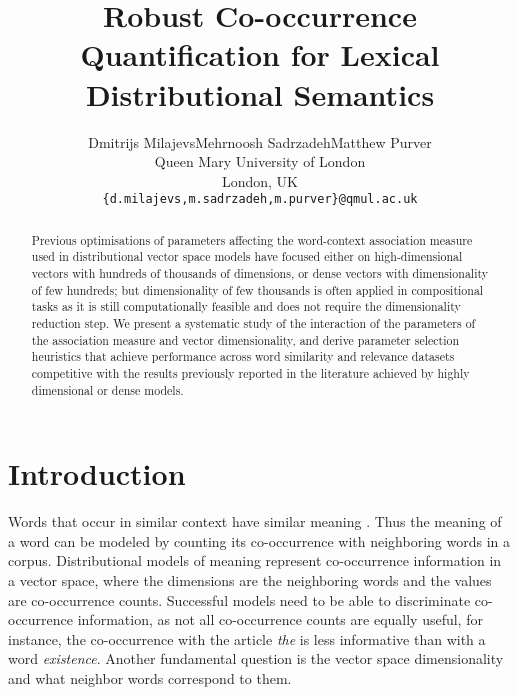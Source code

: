 \documentclass[11pt]{article}
\title{Robust Co-occurrence Quantification for Lexical Distributional Semantics}
\author{Dmitrijs Milajevs\qquad{}Mehrnoosh Sadrzadeh\qquad{}Matthew Purver\\
  Queen Mary University of London\\
  London, UK\\
  {\tt \{d.milajevs,m.sadrzadeh,m.purver\}@qmul.ac.uk}
}
\date{}
\begin{document}
\def\PMI/{$\operatorname{1PMI}$}
\def\SPMI/{$\operatorname{1SPMI}$}
\def\CPMI/{$\operatorname{1CPMI}$}
\def\SCPMI/{$\operatorname{1SCPMI}$}

\def\NPMI/{$\operatorname{nPMI}$}
\def\NSPMI/{$\operatorname{nSPMI}$}
\def\NCPMI/{$\operatorname{nCPMI}$}
\def\NSCPMI/{$\operatorname{nSCPMI}$}

\def\logNPMI/{$\operatorname{lognPMI}$}
\def\logNSPMI/{$\operatorname{lognSPMI}$}
\def\logNCPMI/{$\operatorname{lognCPMI}$}
\def\logNSCPMI/{$\operatorname{lognSCPMI}$}

\maketitle
\begin{abstract}
Previous optimisations of parameters affecting the word-context association measure used in distributional vector space models have focused either on high-dimensional vectors with hundreds of thousands of dimensions, or dense vectors with dimensionality of few hundreds; but dimensionality of few thousands is often applied in compositional tasks as it is still computationally feasible and does not require the dimensionality reduction step. We present a systematic study of the interaction of the parameters of the association measure and vector dimensionality, and derive parameter selection heuristics that achieve performance across word similarity and relevance datasets competitive with the results previously reported in the literature achieved by highly dimensional or dense models.
\end{abstract}

\section{Introduction}
\label{sec:introduction}

Words that occur in similar context have similar meaning \cite{harris1954distributional}. Thus the meaning of a word can be modeled by counting its co-occurrence with neighboring words in a corpus. Distributional models of meaning represent co-occurrence information in a vector space, where the dimensions are the neighboring words and the values are co-occurrence counts. Successful models need to be able to discriminate co-occurrence information, as not all co-occurrence counts are equally useful, for instance, the co-occurrence with the article \textit{the} is less informative than with a word \textit{existence}. Another fundamental question is the vector space dimensionality and what neighbor words correspond to them.
\end{document}
